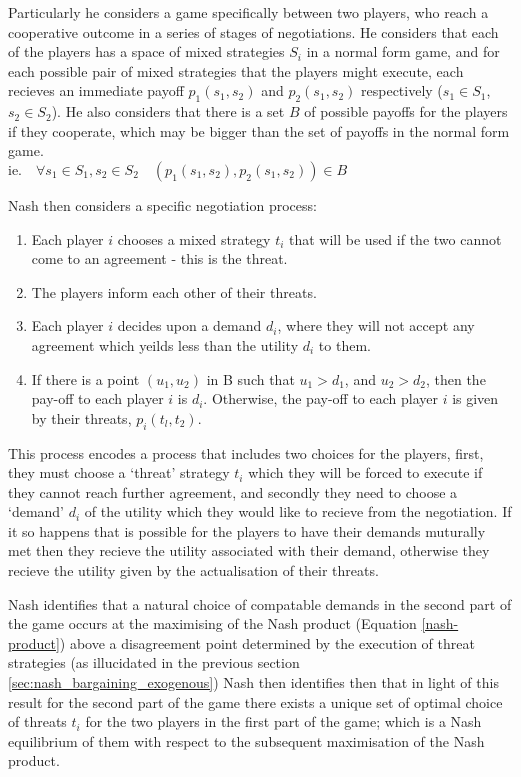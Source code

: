 Particularly he considers a game specifically between two players, who reach a cooperative outcome in a series of stages of negotiations.
He considers that each of the players has a space of mixed strategies $S_i$ in a normal form game, and for each possible pair of mixed strategies that the players might execute, each recieves an immediate payoff $p_1(s_1,s_2)$ and $p_2(s_1,s_2)$ respectively ($s_1\in S_1$, $s_2\in S_2$).
He also considers that there is a set $B$ of possible payoffs for the players if they cooperate, which may be bigger than the set of payoffs in the normal form game.\\
$\text{ie.}\quad \forall s_1\in S_1,s_2\in S_2 \quad (p_1(s_1,s_2), p_2(s_1,s_2)) \in B$

Nash then considers a specific negotiation process:
\begin{enumerate}
\item Each player $i$ chooses a mixed strategy $t_i$ that will be used if the two cannot come to an agreement - this is the threat.
\item The players inform each other of their threats.
\item Each player $i$ decides upon a demand $d_i$, where they will not accept any agreement which yeilds less than the utility $d_i$ to them.
\item If there is a point $(u_1,u_2)$ in B such that $u_1 > d_1$, and $u_2 > d_2$, then the pay-off to each player $i$ is $d_i$. Otherwise, the pay-off to each player $i$ is given by their threats, $p_i(t_l, t_2)$.
\end{enumerate}

This process encodes a process that includes two choices for the players, first, they must choose a `threat' strategy $t_i$ which they will be forced to execute if they cannot reach further agreement, and secondly they need to choose a `demand' $d_i$ of the utility which they would like to recieve from the negotiation.
If it so happens that is possible for the players to have their demands muturally met then they recieve the utility associated with their demand, otherwise they recieve the utility given by the actualisation of their threats.

Nash identifies that a natural choice of compatable demands in the second part of the game occurs at the maximising of the Nash product (Equation \ref{nash-product}) above a disagreement point determined by the execution of threat strategies (as illucidated in the previous section \ref{sec:nash_bargaining_exogenous})
Nash then identifies then that in light of this result for the second part of the game there exists a unique set of optimal choice of threats $t_i$ for the two players in the first part of the game; which is a Nash equilibrium of them with respect to the subsequent maximisation of the Nash product.

